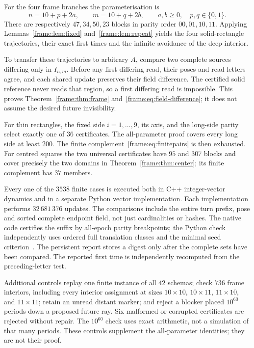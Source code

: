 For the four frame branches the parameterisation is
\[
 n=10+p+2a,\qquad m=10+q+2b,\qquad a,b\ge0,
 \quad p,q\in\{0,1\}.
\]
There are respectively $47,34,50,23$ blocks in parity order $00,01,10,11$. Applying Lemmas~\ref{frame:lem:fixed} and~\ref{frame:lem:repeat} yields the four solid-rectangle trajectories, their exact first times and the infinite avoidance of the deep interior.

To transfer these trajectories to arbitrary $A$, compare two complete sources differing only in $I_{n,m}$. Before any first differing read, their poses and read letters agree, and each shared update preserves their field difference. The certified solid reference never reads that region, so a first differing read is impossible. This proves Theorem~\ref{frame:thm:frame} and~\eqref{frame:eq:field-difference}; it does not assume the desired future invisibility.

For thin rectangles, the fixed side $i=1,\ldots,9$, its axis, and the long-side parity select exactly one of $36$ certificates. The all-parameter proof covers every long side at least $200$. The finite complement~\eqref{frame:eq:finitepairs} is then exhausted. For centred squares the two universal certificates have $95$ and $307$ blocks and cover precisely the two domains in Theorem~\ref{frame:thm:center}; its finite complement has $37$ members.

Every one of the $3538$ finite cases is executed both in C++ integer-vector dynamics and in a separate Python vector implementation. Each implementation performs $32\,681\,376$ updates. The comparisons include the entire turn prefix, pose and sorted complete endpoint field, not just cardinalities or hashes. The native code certifies the suffix by all-epoch parity breakpoints; the Python check independently uses ordered full translation classes and the minimal seed criterion~\cite{jillhewar2026}. The persistent report stores a digest only after the complete sets have been compared. The reported first time is independently recomputed from the preceding-letter test.

Additional controls replay one finite instance of all $42$ schemas; check $736$ frame interiors, including every interior assignment at sizes $10\times10$, $10\times11$, $11\times10$, and $11\times11$; retain an unread distant marker; and reject a blocker placed $10^{60}$ periods down a proposed future ray. Six malformed or corrupted certificates are rejected without repair. The $10^{60}$ check uses exact arithmetic, not a simulation of that many periods. These controls supplement the all-parameter identities; they are not their proof.


